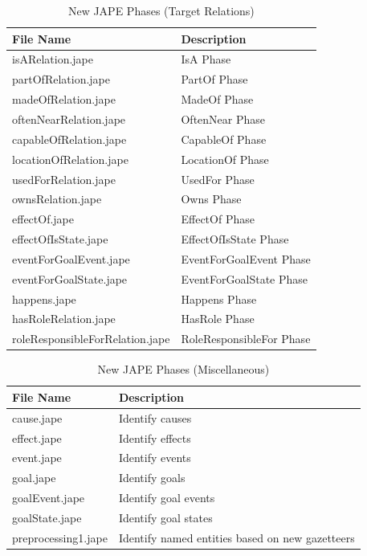 \begin{table}[H]   %
\centering
\caption{New JAPE Phases (Target Relations)} \vspace{0.25em}
\begin{tabular}{|p{6cm}|p{5cm}|} \hline
\textbf{File Name} & \textbf{Description} \\ \hline
isARelation.jape					& IsA Phase \\ \hline
partOfRelation.jape					& PartOf Phase \\ \hline
madeOfRelation.jape					& MadeOf Phase \\ \hline
oftenNearRelation.jape				& OftenNear Phase \\ \hline
capableOfRelation.jape				& CapableOf Phase \\ \hline
locationOfRelation.jape				& LocationOf Phase \\ \hline
usedForRelation.jape				& UsedFor Phase \\ \hline
ownsRelation.jape 					& Owns Phase \\ \hline
effectOf.jape						& EffectOf Phase \\ \hline
effectOfIsState.jape				& EffectOfIsState Phase \\ \hline
eventForGoalEvent.jape				& EventForGoalEvent Phase \\ \hline
eventForGoalState.jape				& EventForGoalState Phase \\ \hline
happens.jape						& Happens Phase \\ \hline
hasRoleRelation.jape				& HasRole Phase \\ \hline
roleResponsibleForRelation.jape		& RoleResponsibleFor Phase \\ \hline
\end{tabular}
\label{tab:newjaperel}
\end{table}

\begin{table}[H]   %
\centering
\caption{New JAPE Phases (Miscellaneous)} \vspace{0.25em}
\begin{tabular}{|p{5cm}|p{5cm}|} \hline
\textbf{File Name} & \textbf{Description} \\ \hline
cause.jape				& Identify causes \\ \hline
effect.jape				& Identify effects \\ \hline
event.jape				& Identify events \\ \hline
goal.jape				& Identify goals \\ \hline
goalEvent.jape			& Identify goal events \\ \hline
goalState.jape			& Identify goal states \\ \hline
preprocessing1.jape		& Identify named entities based on new gazetteers \\ \hline
\end{tabular}
\label{tab:newjapemisc}
\end{table}

